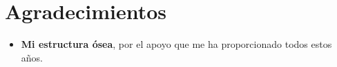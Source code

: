 \chapter*{Agradecimientos}

\begin{itemize}
	\item \textbf{Mi estructura ósea}, por el apoyo que me ha proporcionado todos estos años.

\end{itemize}